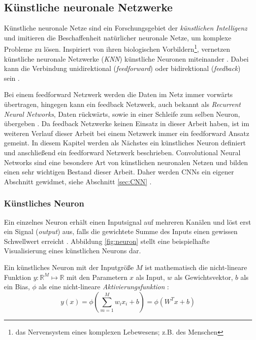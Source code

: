 \subsection{Künstliche neuronale Netzwerke}
\label{sec:KNN}
Künstliche neuronale Netze sind ein Forschungsgebiet der \textit{künstlichen Intelligenz} und imitieren die Beschaffenheit natürlicher neuronale Netze, um komplexe Probleme zu lösen. Inspiriert von ihren biologischen Vorbildern\footnote{das Nervensystem eines komplexen Lebewesens; z.B. des Menschen}, vernetzen künstliche neuronale Netzwerke (\textit{KNN}) künstliche Neuronen miteinander \cite{CS231nConvolutionalNeural}. Dabei kann die Verbindung unidirektional (\textit{feedforward}) oder bidirektional (\textit{feedback}) sein  \cite{Goodfellow-et-al-2016}. 

Bei einem feedforward Netzwerk werden die Daten im Netz immer vorwärts übertragen, hingegen kann ein feedback Netzwerk, auch bekannt als \textit{Recurrent Neural Networks}, Daten rückwärts, sowie in einer Schleife zum selben Neuron, übergeben \cite{Goodfellow-et-al-2016}. Da feedback Netzwerke keinen Einsatz in dieser Arbeit haben, ist im weiteren Verlauf dieser Arbeit bei einem Netzwerk immer ein feedforward Ansatz gemeint. In diesem Kapitel werden als Nächstes ein künstliches Neuron definiert und anschließend ein feedforward Netzwerk beschrieben. Convolutional Neural Networks sind eine besondere Art von künstlichen neuronalen Netzen und bilden einen sehr wichtigen Bestand dieser Arbeit. Daher werden CNNs ein eigener Abschnitt gewidmet, siehe Abschnitt \ref{sec:CNN} .


\subsubsection{Künstliches Neuron}
Ein einzelnes Neuron erhält einen Inputsignal auf mehreren Kanälen und löst erst ein Signal (\textit{output}) aus, falls die gewichtete Summe des Inputs einen gewissen Schwellwert erreicht \cite{CS231nConvolutionalNeural}. Abbildung \ref{fig:neuron} stellt eine beispielhafte Visualisierung eines künstlichen Neurons dar.

Ein künstliches Neuron mit der Inputgröße $M$ ist mathematisch die nicht-lineare Funktion $y : \mathbb{R}^M \mapsto \mathbb{R}$ mit den Parametern $x$ als Input, $w$ als Gewichtsvektor, $b$ als ein Bias, $\phi$ als eine nicht-lineare \textit{Aktivierungsfunktion} \cite{CS231nConvolutionalNeural}:
\begin{equation}
	\label{eq:neuron}
	y(x)=\phi\left(\sum_{m=1}^{M} w_{i} x_{i} + b\right) = \phi(W^Tx+b)
\end{equation}

